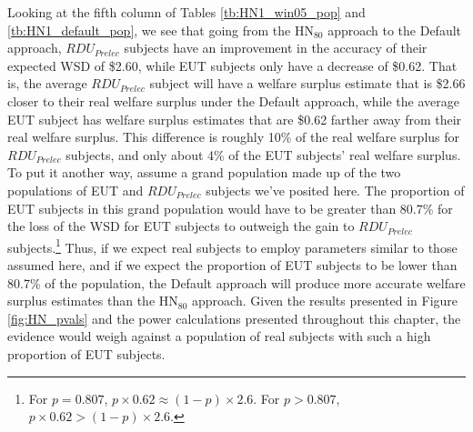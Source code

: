 \documentclass[../main.tex]{subfiles}
\begin{document}
Looking at the fifth column of Tables \ref{tb:HN1_win05_pop} and \ref{tb:HN1_default_pop}, we see that going from the $\text{HN}_{80}$ approach to the Default approach, $\mathit{RDU_{Prelec}}$ subjects have an improvement in the accuracy of their expected WSD of \$2.60, while EUT subjects only have a decrease of \$0.62.
That is, the average $\mathit{RDU_{Prelec}}$ subject will have a welfare surplus estimate that is \$2.66 closer to their real welfare surplus under the Default approach, while the average EUT subject has welfare surplus estimates that are \$0.62 farther away from their real welfare surplus.
This difference is roughly 10\% of the real welfare surplus for $\mathit{RDU_{Prelec}}$ subjects, and only about 4\% of the EUT subjects' real welfare surplus.
To put it another way, assume a grand population made up of the two populations of EUT and $\mathit{RDU_{Prelec}}$ subjects we've posited here.
The proportion of EUT subjects in this grand population would have to be greater than 80.7\% for the loss of the WSD for EUT subjects to outweigh the gain to $\mathit{RDU_{Prelec}}$ subjects.\footnote{
	For $p = 0.807$, $p \times 0.62 \approx (1 - p) \times 2.6$.
	For $p > 0.807$, $p \times 0.62 > (1 - p) \times 2.6$.
}
Thus, if we expect real subjects to employ parameters similar to those assumed here, and if we expect the proportion of EUT subjects to be lower than  80.7\% of the population, the Default approach will produce more accurate welfare surplus estimates than the $\text{HN}_{80}$ approach.
Given the results presented in Figure \ref{fig:HN_pvals} and the power calculations presented throughout this chapter, the evidence would weigh against a population of real subjects with such a high proportion of EUT subjects.
\end{document}
